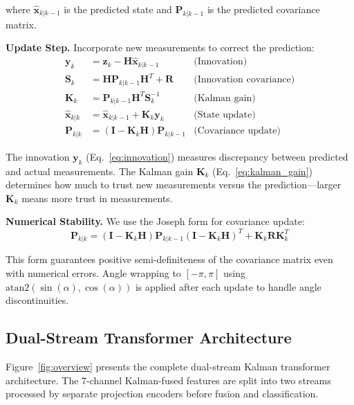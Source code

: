 where $\hat{\mathbf{x}}_{k|k-1}$ is the predicted state and $\mathbf{P}_{k|k-1}$ is the predicted covariance matrix.

\textbf{Update Step.} Incorporate new measurements to correct the prediction:
\begin{align}
\mathbf{y}_k &= \mathbf{z}_k - \mathbf{H} \hat{\mathbf{x}}_{k|k-1} & \text{(Innovation)} \label{eq:innovation} \\
\mathbf{S}_k &= \mathbf{H} \mathbf{P}_{k|k-1} \mathbf{H}^T + \mathbf{R} & \text{(Innovation covariance)} \label{eq:innov_cov} \\
\mathbf{K}_k &= \mathbf{P}_{k|k-1} \mathbf{H}^T \mathbf{S}_k^{-1} & \text{(Kalman gain)} \label{eq:kalman_gain} \\
\hat{\mathbf{x}}_{k|k} &= \hat{\mathbf{x}}_{k|k-1} + \mathbf{K}_k \mathbf{y}_k & \text{(State update)} \label{eq:state_update} \\
\mathbf{P}_{k|k} &= (\mathbf{I} - \mathbf{K}_k \mathbf{H}) \mathbf{P}_{k|k-1} & \text{(Covariance update)} \label{eq:cov_update}
\end{align}

The innovation $\mathbf{y}_k$ (Eq.~\ref{eq:innovation}) measures discrepancy between predicted and actual measurements. The Kalman gain $\mathbf{K}_k$ (Eq.~\ref{eq:kalman_gain}) determines how much to trust new measurements versus the prediction---larger $\mathbf{K}_k$ means more trust in measurements.

\textbf{Numerical Stability.} We use the Joseph form for covariance update:
\begin{equation}
\mathbf{P}_{k|k} = (\mathbf{I} - \mathbf{K}_k \mathbf{H}) \mathbf{P}_{k|k-1} (\mathbf{I} - \mathbf{K}_k \mathbf{H})^T + \mathbf{K}_k \mathbf{R} \mathbf{K}_k^T
\label{eq:joseph_form}
\end{equation}

This form guarantees positive semi-definiteness of the covariance matrix even with numerical errors. Angle wrapping to $[-\pi, \pi]$ using $\text{atan2}(\sin(\alpha), \cos(\alpha))$ is applied after each update to handle angle discontinuities.

\subsection{Dual-Stream Transformer Architecture}
\label{sec:DualStream}

Figure~\ref{fig:overview} presents the complete dual-stream Kalman transformer architecture. The 7-channel Kalman-fused features are split into two streams processed by separate projection encoders before fusion and classification.

